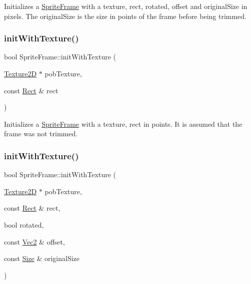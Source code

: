 Initializes a \hyperlink{classSpriteFrame}{Sprite\+Frame} with a texture, rect, rotated, offset and original\+Size in pixels. The original\+Size is the size in points of the frame before being trimmed. \mbox{\label{classSpriteFrame_ab6f82a9d511a1aeb016621dabda96669}} 
\subsubsection{\texorpdfstring{init\+With\+Texture()}{initWithTexture()}\hspace{0.1cm}{\footnotesize\ttfamily [3/4]}}
{\footnotesize\ttfamily bool Sprite\+Frame\+::init\+With\+Texture (\begin{DoxyParamCaption}\item[{\hyperlink{classTexture2D}{Texture2D} $\ast$}]{pob\+Texture,  }\item[{const \hyperlink{classRect}{Rect} \&}]{rect }\end{DoxyParamCaption})}

Initializes a \hyperlink{classSpriteFrame}{Sprite\+Frame} with a texture, rect in points. It is assumed that the frame was not trimmed. \mbox{\label{classSpriteFrame_a34c705b9057c0fac4d6697a235c67df8}} 
\subsubsection{\texorpdfstring{init\+With\+Texture()}{initWithTexture()}\hspace{0.1cm}{\footnotesize\ttfamily [4/4]}}
{\footnotesize\ttfamily bool Sprite\+Frame\+::init\+With\+Texture (\begin{DoxyParamCaption}\item[{\hyperlink{classTexture2D}{Texture2D} $\ast$}]{pob\+Texture,  }\item[{const \hyperlink{classRect}{Rect} \&}]{rect,  }\item[{bool}]{rotated,  }\item[{const \hyperlink{classVec2}{Vec2} \&}]{offset,  }\item[{const \hyperlink{classSize}{Size} \&}]{original\+Size }\end{DoxyParamCaption})}

